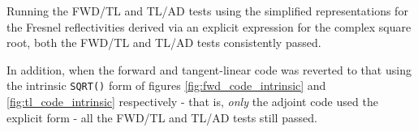 Running the FWD/TL and TL/AD tests using the simplified representations for the Fresnel reflectivities derived via an explicit expression for the complex square root, both the FWD/TL and TL/AD tests consistently passed.

In addition, when the forward and tangent-linear code was reverted to that using the intrinsic \texttt{SQRT()} form of figures \ref{fig:fwd_code_intrinsic} and \ref{fig:tl_code_intrinsic} respectively - that is, \textit{only} the adjoint code used the explicit form - all the FWD/TL and TL/AD tests still passed.


